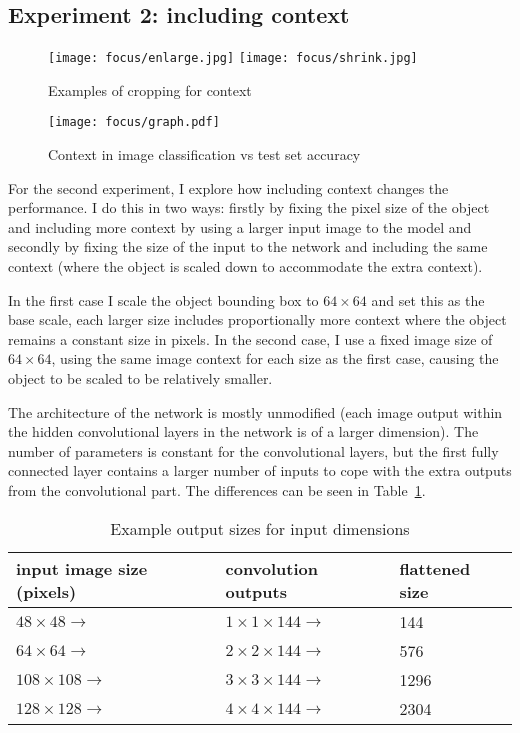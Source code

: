 \subsection {Experiment 2: including context}

\begin{figure}[t]
\centering
\texttt{[image: focus/enlarge.jpg]}
\texttt{[image: focus/shrink.jpg]}
\label{fig:focus_context}
\caption{Examples of cropping for context}

\end{figure}


\begin{figure}[h]
\centering
\texttt{[image: focus/graph.pdf]}
\caption{Context in image classification vs test set accuracy}
\label{fig:focus_exp2}
\end{figure}

For the second experiment, I explore how including context changes the performance. I do this in two ways: firstly by fixing the pixel size of the object and including more context by using a larger input image to the model and secondly by fixing the size of the input to the network and including the same context (where the object is scaled down to accommodate the extra context).

In the first case I scale the object bounding box to $ 64 \times 64 $ and set this as the base scale, each larger size includes proportionally more context where the object remains a constant size in pixels. In the second case, I use a fixed image size of $ 64 \times 64 $, using the same image context for each size as the first case, causing the object to be scaled to be relatively smaller. 

The architecture of the network is mostly unmodified (each image output within the hidden convolutional layers in the network is of a larger dimension). The number of parameters is constant for the convolutional layers, but the first fully connected layer contains a larger number of inputs to cope with the extra outputs from the convolutional part. The differences can be seen in Table~\ref{fig:focus_sizes}.


\begin{table}[h]
  \centering
    \caption{Example output sizes for input dimensions }
\begin{tabular}{ l l l } 
 
 input image size (pixels) & convolution outputs & flattened size \\
 \toprule
 
 $ 48 \times 48  \rightarrow $ & $ 1\times1\times144 \rightarrow $ & 144 \\
 $ 64 \times 64  \rightarrow $ & $ 2\times2\times144 \rightarrow $ & 576 \\
 $ 108 \times 108  \rightarrow $ & $ 3\times3\times144 \rightarrow $ & 1296 \\
 $ 128 \times 128  \rightarrow $ & $ 4\times4\times144 \rightarrow $ & 2304 \\
 
\end{tabular}
\label{fig:focus_sizes}
\end{table}

